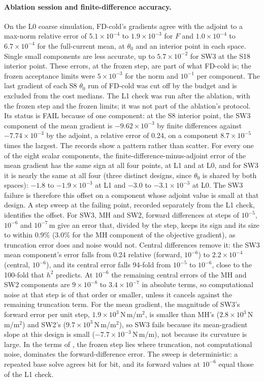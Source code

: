 \documentclass{anvil-paper}
\begin{document}
\paragraph{Ablation session and finite-difference accuracy.}
On the L0 coarse simulation, FD-cold's gradients agree with the adjoint to a max-norm
relative error of $5.1\times10^{-4}$ to $1.9\times10^{-3}$ for $F$ and
$1.0\times10^{-4}$ to $6.7\times10^{-4}$ for the full-current mean, at
$\theta_0$ and an interior point in each space. Single small components are
less accurate, up to $5.7\times10^{-2}$ for SW3 at the S18 interior
point. These errors, at the frozen step, are part of what FD-cold is; the frozen
acceptance limits were $5\times10^{-3}$ for the norm and $10^{-1}$ per
component. The last gradient of each S8 $\theta_0$ run of FD-cold was cut
off by the budget and is excluded from the cost medians. The L1 check was
run after the ablation, with the frozen step
and the frozen limits; it was not part of the ablation's protocol. Its
status is FAIL because of one component: at the S8 interior point, the
SW3 component of the mean gradient is $-9.62\times10^{-3}$ by finite
differences against $-7.74\times10^{-3}$ by the adjoint, a relative error
of 0.24, on a component $8.7\times10^{-5}$ times the largest. The records
show a pattern rather than scatter. For every one of the eight scalar
components, the finite-difference-minus-adjoint error of the mean gradient
has the same sign at all four points, at L1 and at L0, and for SW3 it is
nearly the same at all four (three distinct designs, since $\theta_0$ is
shared by both spaces): $-1.8$ to $-1.9\times10^{-3}$ at L1 and $-3.0$ to
$-3.1\times10^{-3}$ at L0. The SW3 failure is therefore this offset on a component whose adjoint
value is small at that design. A step sweep at the failing point,
recorded separately from the L1 check, identifies the offset. For SW3, MH
and SW2, forward differences at steps of $10^{-5}$, $10^{-6}$ and
$10^{-7}$\,m give an error that, divided by the step, keeps its sign and
its size to within 0.9\% (3.0\% for the MH component of the objective
gradient), as truncation error does and noise would not. Central
differences remove it: the SW3 mean component's error falls from 0.24
relative (forward, $10^{-6}$) to $2.2\times10^{-4}$ (central, $10^{-6}$),
and its central error falls 94-fold from $10^{-5}$ to $10^{-6}$, close to
the 100-fold that $h^2$ predicts. At $10^{-6}$ the remaining central errors
of the MH and SW2 components are $9\times10^{-8}$ to $3.4\times10^{-7}$ in
absolute terms, so computational noise at that step is of that order or
smaller, unless it cancels against the remaining truncation term. For the
mean gradient, the magnitude of SW3's forward error per unit step,
$1.9\times10^{3}$\,N\,m/m$^2$, is smaller than MH's
($2.8\times10^{3}$\,N\,m/m$^2$) and SW2's ($9.7\times10^{3}$\,N\,m/m$^2$), so SW3 fails because its mean-gradient
slope at this design is small ($-7.7\times10^{-3}$\,N\,m/m), not because
its curvature is large. In the terms of \citet{more2011estimating,more2012estimating},
the frozen step lies where truncation, not computational noise, dominates
the forward-difference error. The sweep is deterministic: a repeated base
solve agrees bit for bit, and its forward values at $10^{-6}$ equal those of
the L1 check.
\end{document}
